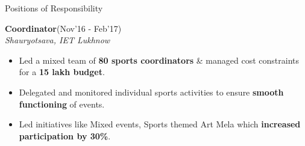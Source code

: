 \begin{rSection}{Positions of Responsibility}

\vspace{-.4cm}

\item{\bf {\bf Coordinator}}\hfill{(Nov'16 - Feb'17)}\\ \emph{Shauryotsava, IET Lukhnow}\\
[-0.4cm]

\begin{itemize}[leftmargin=*]

	\itemsep \sepval

	\item Led a mixed team of {\bf 80 sports coordinators} \& managed cost constraints for a {\bf 15 lakh budget}.

	\item Delegated and monitored individual sports activities to ensure {\bf smooth functioning} of events.

	\item Led initiatives like Mixed events, Sports themed Art Mela which {\bf increased participation by 30\%}.

\end{itemize}

\end{rSection}
